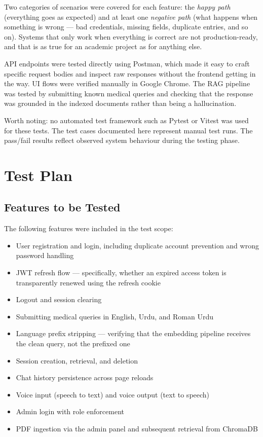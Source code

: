 Two categories of scenarios were covered for each feature: the \textit{happy path}
(everything goes as expected) and at least one \textit{negative path} (what happens
when something is wrong --- bad credentials, missing fields, duplicate entries, and so
on). Systems that only work when everything is correct are not production-ready, and
that is as true for an academic project as for anything else.

API endpoints were tested directly using Postman, which made it easy to craft specific
request bodies and inspect raw responses without the frontend getting in the way. UI
flows were verified manually in Google Chrome. The RAG pipeline was tested by submitting
known medical queries and checking that the response was grounded in the indexed
documents rather than being a hallucination.

Worth noting: no automated test framework such as Pytest or Vitest was used for these
tests. The test cases documented here represent manual test runs. The pass/fail results
reflect observed system behaviour during the testing phase.

\section{Test Plan}

\subsection{Features to be Tested}

The following features were included in the test scope:

\begin{itemize}
  \item User registration and login, including duplicate account prevention and wrong
        password handling
  \item JWT refresh flow --- specifically, whether an expired access token is
        transparently renewed using the refresh cookie
  \item Logout and session clearing
  \item Submitting medical queries in English, Urdu, and Roman Urdu
  \item Language prefix stripping --- verifying that the embedding pipeline receives
        the clean query, not the prefixed one
  \item Session creation, retrieval, and deletion
  \item Chat history persistence across page reloads
  \item Voice input (speech to text) and voice output (text to speech)
  \item Admin login with role enforcement
  \item PDF ingestion via the admin panel and subsequent retrieval from ChromaDB
\end{itemize}

